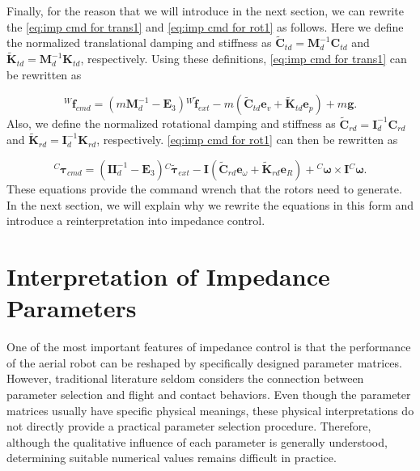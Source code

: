Finally, for the reason that we will introduce in the next section, we can rewrite the \eqref{eq:imp cmd for trans1} and \eqref{eq:imp cmd for rot1} as follows. Here we define the normalized translational damping and stiffness as $\tilde{\boldsymbol{C}}_{td} = \boldsymbol{M}^{-1}_d\boldsymbol{C}_{td}$ and $\tilde{\boldsymbol{K}}_{td} = \boldsymbol{M}^{-1}_d\boldsymbol{K}_{td}$, respectively. Using these definitions, \eqref{eq:imp cmd for trans1} can be rewritten as

\begin{equation}
\label{eq:imp cmd for trans2}
    {^W\!\boldsymbol{f}_{cmd}}=(m\boldsymbol{M}^{-1}_d-\boldsymbol{E}_3){^W\!\boldsymbol{\tilde{f}}_{ext}}-m(\tilde{\boldsymbol{C}}_{td}{\boldsymbol{e}_v}+{\tilde{\boldsymbol{K}}_{td}}{\boldsymbol{e}_p})+m\boldsymbol{g}.
\end{equation}
Also, we define the normalized rotational damping and stiffness as $\tilde{\boldsymbol{C}}_{rd} = \boldsymbol{I}^{-1}_d\boldsymbol{C}_{rd}$ and $\tilde{\boldsymbol{K}}_{rd} = \boldsymbol{I}^{-1}_d\boldsymbol{K}_{rd}$, respectively. \eqref{eq:imp cmd for rot1} can then be rewritten as

\begin{equation}
\label{eq:imp cmd for rot2}
    {^{C}\boldsymbol{\tau}_{cmd}}=(\boldsymbol{I}\boldsymbol{I}^{-1}_d-\boldsymbol{E}_3){^{C}}\boldsymbol{\tilde{\tau}}_{ext}-\boldsymbol{I}(\tilde{\boldsymbol{C}}_{rd}{\boldsymbol{e}_\omega}+\tilde{\boldsymbol{K}}_{rd}{\boldsymbol{e}_R})
    +{^{C}\boldsymbol{\omega}} \times \boldsymbol{I}{^{C}\boldsymbol{\omega}}.
\end{equation}
These equations provide the command wrench that the rotors need to generate. In the next section, we will explain why we rewrite the equations in this form and introduce a reinterpretation into impedance control.


\section{Interpretation of Impedance Parameters}
\label{sec:imp_param_tuning}
One of the most important features of impedance control is that the performance of the aerial robot can be reshaped by specifically designed parameter matrices. However, traditional literature seldom considers the connection between parameter selection and flight and contact behaviors. Even though the parameter matrices usually have specific physical meanings, these physical interpretations do not directly provide a practical parameter selection procedure. Therefore, although the qualitative influence of each parameter is generally understood, determining suitable numerical values remains difficult in practice. 

